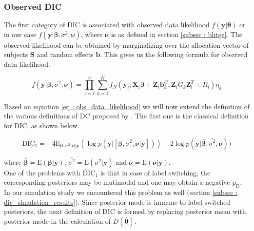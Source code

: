 \subsubsection{Observed DIC}
The first category of DIC is associated with observed data likelihood $f(\boldsymbol{y}|\boldsymbol{\theta})$ or in our case $f(\boldsymbol{y}|\boldsymbol{\beta}, \sigma^2, \boldsymbol{\nu})$, where $\boldsymbol{\nu}$ is as defined in section \ref{subsec : bhtge}. The observed likelihood can be obtained by marginalizing over the allocation vector of subjects $\boldsymbol{S}$ and random effects $\boldsymbol{b}$. This gives us the following formula for observed data likelihood.

\begin{equation}
\label{eq : obs_data_likelihood}
f(\boldsymbol{y}|\boldsymbol{\beta}, \sigma^2, \boldsymbol{\nu}) = \prod_{i=1}^n \sum_{k=1}^K f_N(\boldsymbol{y}_i; \boldsymbol{X}_i\boldsymbol{\beta} + \boldsymbol{Z}_i \boldsymbol{b}_k^C, \boldsymbol{Z}_{i} G_k \boldsymbol{Z}_{i}^T+ R_i) \eta_k
\end{equation}
 
Based on equation \ref{eq : obs_data_likelihood} we will now extend the definition of the various definitions of DC proposed by \citet{celeux_deviance_2006}. The first one is the classical definition for DIC, as shown below.

\begin{equation}
\label{eq : DIC1}
\text{DIC}_1 = -4\text{E}_{\boldsymbol{\beta}, \sigma^2, \boldsymbol{\nu}|\boldsymbol{y}} (\log{p(\boldsymbol{y}|[\boldsymbol{\beta}, \sigma^2, \boldsymbol{\nu}|\boldsymbol{y}])}) + 2\log{p(\boldsymbol{y}|\boldsymbol{\bar{\beta}}, \bar{\sigma^2}, \boldsymbol{\bar{\nu}})})
\end{equation}

where 
$\boldsymbol{\bar{\beta}}=\text{E}(\boldsymbol{\beta}|\boldsymbol{y})$, 
$\bar{\sigma^2}=\text{E}(\sigma^2|\boldsymbol{y})$ and 
$\boldsymbol{\bar{\nu}}=\text{E}(\boldsymbol{\nu}|\boldsymbol{y})$,\\

One of the problems with $\text{DIC}_1$ is that in case of label switching, the corresponding posteriors may be mutimodal and one may obtain a negative $\text{p}_\text{D}$. In our simulation study we encountered this problem as well (section \ref{subsec : dic_simulation_results}). Since posterior mode is immune to label switched posteriors, the next definition of DIC is formed by replacing posterior mean with posterior mode in the calculation of $D(\boldsymbol{\bar{\theta}})$. 

